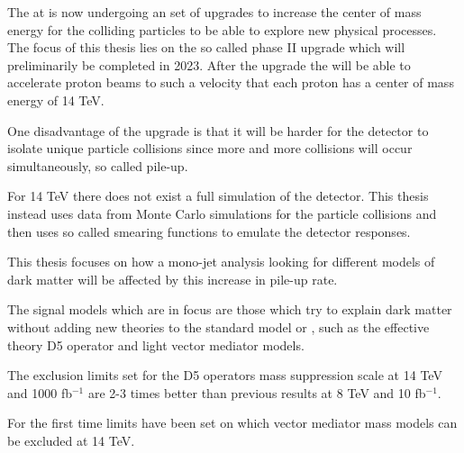 The \abbrLHC at \abbrCERN is now undergoing an set of upgrades to increase the center of mass energy for the colliding particles to be able to explore new physical processes. The focus of this thesis lies on the so called phase II upgrade which will preliminarily be completed in 2023. After the upgrade the \abbrLHC will be able to accelerate proton beams to such a velocity that each proton has a center of mass energy of 14 TeV.

One disadvantage of the upgrade is that it will be harder for the \abbrATLAS detector to isolate unique particle collisions since more and more collisions will occur simultaneously, so called pile-up. 

For 14 TeV there does not exist a full simulation of the \abbrATLAS detector. This thesis instead uses data from Monte Carlo simulations for the particle collisions and then uses so called smearing functions to emulate the detector responses. 

This thesis focuses on how a mono-jet analysis looking for different \abbrWIMP models of dark matter will be affected by this increase in pile-up rate.

The signal models which are in focus are those which try to explain dark matter without adding new theories to the standard model or \abbrQFT , such as the effective theory D5 operator and light vector mediator models.

The exclusion limits set for the D5 operators mass suppression scale at 14 TeV and 1000 fb$^{-1}$ are 2-3 times better than previous results at 8 TeV and 10 fb$^{-1}$. 

For the first time limits have been set on which vector mediator mass models can be excluded at 14 TeV.
